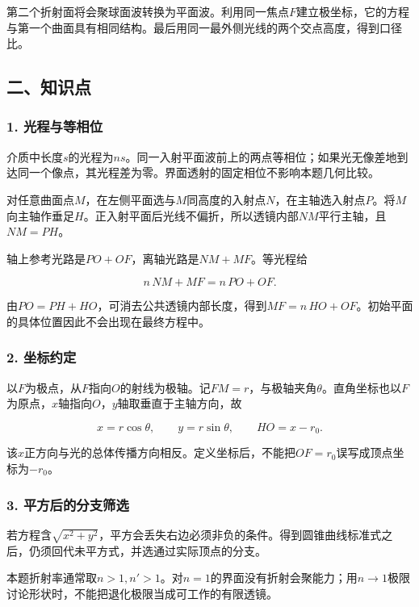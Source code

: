 \documentclass[12pt,a4paper,fontset=fandol]{ctexart}
\begin{document}
第二个折射面将会聚球面波转换为平面波。利用同一焦点\(F\)建立极坐标，它的方程与第一个曲面具有相同结构。最后用同一最外侧光线的两个交点高度，得到口径比。

\subsection{二、知识点}\label{ux4e8cux77e5ux8bc6ux70b9}

\subsubsection{1.
光程与等相位}\label{ux5149ux7a0bux4e0eux7b49ux76f8ux4f4d}

介质中长度\(s\)的光程为\(ns\)。同一入射平面波前上的两点等相位；如果光无像差地到达同一个像点，其光程差为零。界面透射的固定相位不影响本题几何比较。

对任意曲面点\(M\)，在左侧平面选与\(M\)同高度的入射点\(N\)，在主轴选入射点\(P\)。将\(M\)向主轴作垂足\(H\)。正入射平面后光线不偏折，所以透镜内部\(NM\)平行主轴，且\(NM=PH\)。

轴上参考光路是\(PO+OF\)，离轴光路是\(NM+MF\)。等光程给

\[
n\,NM+MF=n\,PO+OF.
\]

由\(PO=PH+HO\)，可消去公共透镜内部长度，得到\(MF=n\,HO+OF\)。初始平面的具体位置因此不会出现在最终方程中。

\subsubsection{2. 坐标约定}\label{ux5750ux6807ux7ea6ux5b9a}

以\(F\)为极点，从\(F\)指向\(O\)的射线为极轴。记\(FM=r\)，与极轴夹角\(\theta\)。直角坐标也以\(F\)为原点，\(x\)轴指向\(O\)，\(y\)轴取垂直于主轴方向，故

\[
x=r\cos\theta,\qquad y=r\sin\theta,\qquad
HO=x-r_0.
\]

该\(x\)正方向与光的总体传播方向相反。定义坐标后，不能把\(OF=r_0\)误写成顶点坐标为\(-r_0\)。

\subsubsection{3.
平方后的分支筛选}\label{ux5e73ux65b9ux540eux7684ux5206ux652fux7b5bux9009}

若方程含\(\sqrt{x^2+y^2}\)，平方会丢失右边必须非负的条件。得到圆锥曲线标准式之后，仍须回代未平方式，并选通过实际顶点的分支。

本题折射率通常取\(n>1,n'>1\)。对\(n=1\)的界面没有折射会聚能力；用\(n\to1\)极限讨论形状时，不能把退化极限当成可工作的有限透镜。
\end{document}
